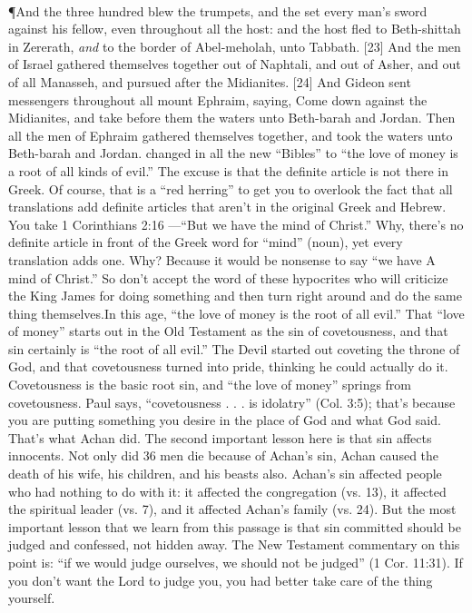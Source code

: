 {\\
\P \textcolor[rgb]{0.00,0.00,1.00}{And the three hundred blew the trumpets, and the  set every man's sword against his fellow, even throughout all the host: and the host fled to Beth-shittah in Zererath, \emph{and} to the border of Abel-meholah, unto Tabbath.}
[23] \textcolor[rgb]{0.00,0.00,1.00}{And the men of Israel gathered themselves together out of Naphtali, and out of Asher, and out of all Manasseh, and pursued after the Midianites.}
[24] \textcolor[rgb]{0.00,0.00,1.00}{And Gideon sent messengers throughout all mount Ephraim, saying, Come down against the Midianites, and take before them the waters unto Beth-barah and Jordan. Then all the men of Ephraim gathered themselves together, and took the waters unto Beth-barah and Jordan.}%
changed in all the new “Bibles” to “the love of money is a root of all kinds of evil.” The
excuse is that the definite article is not there in
Greek. Of course, that is a “red herring” to get
you to overlook the fact that all translations add
definite articles that aren’t in the original Greek
and Hebrew. You take 1 Corinthians 2:16
—“But we have the mind of Christ.” Why,
there’s no definite article in front of the Greek
word for “mind” (noun), yet every translation
adds one. Why? Because it would be nonsense
to say “we have A mind of Christ.” So don’t
accept the word of these hypocrites who will
criticize the King James for doing something
and then turn right around and do the same
thing themselves.In this age, “the love of money is the root
of all evil.” That “love of money” starts out in
the Old Testament as the sin of covetousness,
and that sin certainly is “the root of all evil.”
The Devil started out coveting the throne of
God, and that covetousness turned into pride,
thinking he could actually do it. Covetousness is
the basic root sin, and “the love of money”
springs from covetousness. Paul says,
“covetousness . . . is idolatry” (Col. 3:5);
that’s because you are putting something you
desire in the place of God and what God said.
That’s what Achan did.
The second important lesson here is that sin
affects innocents. Not only did 36 men die because of Achan’s sin, Achan caused the death of his wife, his children, and his beasts also. Achan’s sin affected people who had nothing to do with it: it affected the congregation (vs. 13), it affected the spiritual leader (vs. 7), and it affected Achan’s family (vs. 24). But the most important lesson that we learn from this passage is that sin committed should be judged and confessed, not hidden away. The New Testament commentary on this point is: “if we would judge ourselves, we should not be judged” (1 Cor. 11:31). If you don’t want the Lord to judge you, you had better take care of the thing yourself.}

